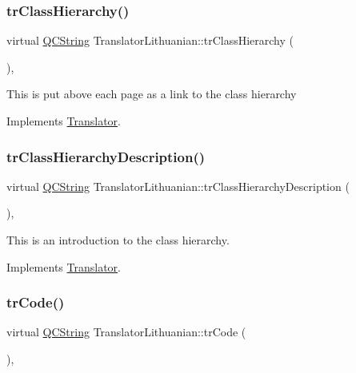 \subsubsection{\texorpdfstring{trClassHierarchy()}{trClassHierarchy()}}
{\footnotesize\ttfamily virtual \mbox{\hyperlink{class_q_c_string}{Q\+C\+String}} Translator\+Lithuanian\+::tr\+Class\+Hierarchy (\begin{DoxyParamCaption}{ }\end{DoxyParamCaption})\hspace{0.3cm}{\ttfamily [inline]}, {\ttfamily [virtual]}}

This is put above each page as a link to the class hierarchy 

Implements \mbox{\hyperlink{class_translator}{Translator}}.

\mbox{\label{class_translator_lithuanian_a8f1b1425f9c6345a06ec1d473f1879b2}} 
\subsubsection{\texorpdfstring{trClassHierarchyDescription()}{trClassHierarchyDescription()}}
{\footnotesize\ttfamily virtual \mbox{\hyperlink{class_q_c_string}{Q\+C\+String}} Translator\+Lithuanian\+::tr\+Class\+Hierarchy\+Description (\begin{DoxyParamCaption}{ }\end{DoxyParamCaption})\hspace{0.3cm}{\ttfamily [inline]}, {\ttfamily [virtual]}}

This is an introduction to the class hierarchy. 

Implements \mbox{\hyperlink{class_translator}{Translator}}.

\mbox{\label{class_translator_lithuanian_a1f12e615ded1aee9e79212218eb3dc0a}} 
\subsubsection{\texorpdfstring{trCode()}{trCode()}}
{\footnotesize\ttfamily virtual \mbox{\hyperlink{class_q_c_string}{Q\+C\+String}} Translator\+Lithuanian\+::tr\+Code (\begin{DoxyParamCaption}{ }\end{DoxyParamCaption})\hspace{0.3cm}{\ttfamily [inline]}, {\ttfamily [virtual]}}

